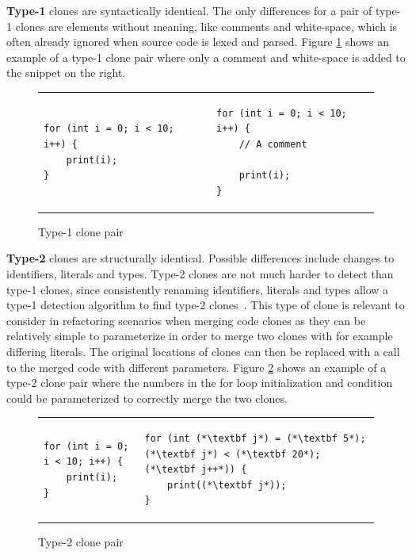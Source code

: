 \textbf{Type-1} clones are syntactically identical. The only differences for a pair of
type-1 clones are elements without meaning, like comments and white-space, which is often
already ignored when source code is lexed and parsed. Figure \ref{fig:type1clone} shows an
example of a type-1 clone pair where only a comment and white-space is added to the
snippet on the right.

\begin{figure}[t]
	\begin{center}
        \begin{tabular}{p{5cm} | p{5cm}}
			\begin{lstlisting}
for (int i = 0; i < 10;   i++) {
    print(i);
}
\end{lstlisting} &
			\begin{lstlisting}
for (int i = 0; i < 10; i++) {
    // A comment

    print(i);
}
            \end{lstlisting}
		\end{tabular}
	\end{center}
    \caption{Type-1 clone pair}
    \label{fig:type1clone}
\end{figure}


\textbf{Type-2} clones are structurally identical. Possible differences include changes to
identifiers, literals and types. Type-2 clones are not much harder to detect than type-1
clones, since consistently renaming identifiers, literals and types allow a type-1
detection algorithm to find type-2 clones~\cite{Bakerdup}. This type of clone is relevant
to consider in refactoring scenarios when merging code clones as they can be relatively
simple to parameterize in order to merge two clones with for example differing literals.
The original locations of clones can then be replaced with a call to the merged code with
different parameters. Figure \ref{fig:type2clone} shows an example of a type-2 clone pair
where the numbers in the for loop initialization and condition could be parameterized to
correctly merge the two clones.

\begin{figure}[t]
	\begin{center}
        \begin{tabular}{p{5cm} | p{5cm}}
\begin{lstlisting}
for (int i = 0; i < 10; i++) {
    print(i);
}
\end{lstlisting} & \begin{lstlisting}
for (int (*\textbf j*) = (*\textbf 5*); (*\textbf j*) < (*\textbf 20*); (*\textbf j++*)) {
    print((*\textbf j*));
}
\end{lstlisting}
		\end{tabular}
	\end{center}
	\caption{Type-2 clone pair}
	\label{fig:type2clone}
\end{figure}

